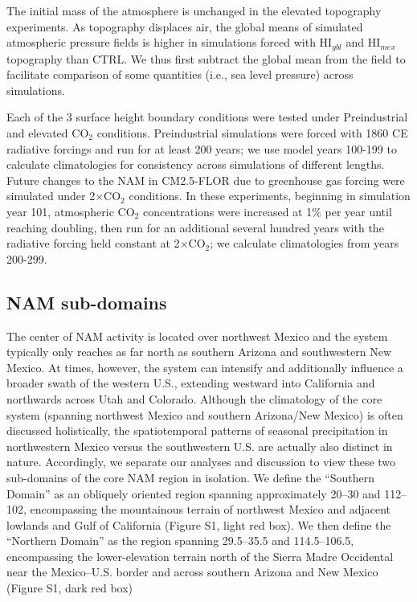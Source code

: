 \documentclass[draft]{agujournal2019}
\begin{document}
The initial mass of the atmosphere is unchanged in the elevated topography experiments. As topography displaces air, the global means of simulated atmospheric pressure fields is higher in simulations forced with HI$_{gbl}$ and HI$_{mex}$ topography than CTRL. We thus first subtract the global mean from the field to facilitate comparison of some quantities (i.e., sea level pressure) across simulations.

Each of the 3 surface height boundary conditions were tested under Preindustrial and elevated CO$_2$ conditions. Preindustrial simulations were forced with 1860 CE radiative forcings and run for at least 200 years; we use model years 100-199 to calculate climatologies for consistency across simulations of different lengths. Future changes to the NAM in CM2.5-FLOR due to greenhouse gas forcing were simulated under 2$\times$CO$_2$ conditions. In these experiments, beginning in simulation year 101, atmospheric CO$_2$ concentrations were increased at 1\% per year until reaching doubling, then run for an additional several hundred years with the radiative forcing held constant at 2$\times$CO$_2$; we calculate climatologies from years 200-299. 

\subsection{NAM sub-domains}
The center of NAM activity is located over northwest Mexico and the system typically only reaches as far north as southern Arizona and southwestern New Mexico. At times, however, the system can intensify and additionally influence a broader swath of the western U.S., extending westward into California and northwards across Utah and Colorado. Although the climatology of the core system (spanning northwest Mexico and southern Arizona/New Mexico) is often discussed holistically, the spatiotemporal patterns of seasonal precipitation in northwestern Mexico versus the southwestern U.S. are actually also distinct in nature. Accordingly, we separate our analyses and discussion to view these two sub-domains of the core NAM region in isolation. We define the ``Southern Domain'' as an obliquely oriented region spanning approximately 20–30 and 112–102, encompassing the mountainous terrain of northwest Mexico and adjacent lowlands and Gulf of California (Figure S1, light red box). We then define the ``Northern Domain'' as the region spanning 29.5–35.5 and 114.5–106.5, encompassing the lower-elevation terrain north of the Sierra Madre Occidental near the Mexico–U.S. border and across southern Arizona and New Mexico (Figure S1, dark red box)
\end{document}
